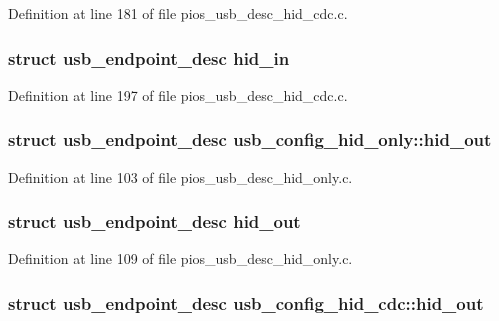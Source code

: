Definition at line 181 of file pios\-\_\-usb\-\_\-desc\-\_\-hid\-\_\-cdc.\-c.

\hypertarget{group___p_i_o_s___u_s_b___d_e_s_c_gad74809997499537622da0aaac4d1c3da}{
\subsubsection[{hid\-\_\-in}]{\setlength{\rightskip}{0pt plus 5cm}struct {\bf usb\-\_\-endpoint\-\_\-desc} hid\-\_\-in}}\label{group___p_i_o_s___u_s_b___d_e_s_c_gad74809997499537622da0aaac4d1c3da}


Definition at line 197 of file pios\-\_\-usb\-\_\-desc\-\_\-hid\-\_\-cdc.\-c.

\hypertarget{group___p_i_o_s___u_s_b___d_e_s_c_ga0bdaf8c80f7739bea621a6d5aa272641}{
\subsubsection[{hid\-\_\-out}]{\setlength{\rightskip}{0pt plus 5cm}struct {\bf usb\-\_\-endpoint\-\_\-desc} usb\-\_\-config\-\_\-hid\-\_\-only\-::hid\-\_\-out}}\label{group___p_i_o_s___u_s_b___d_e_s_c_ga0bdaf8c80f7739bea621a6d5aa272641}


Definition at line 103 of file pios\-\_\-usb\-\_\-desc\-\_\-hid\-\_\-only.\-c.

\hypertarget{group___p_i_o_s___u_s_b___d_e_s_c_ga0e5a30c27a737b9c3e117e4e8b755b8d}{
\subsubsection[{hid\-\_\-out}]{\setlength{\rightskip}{0pt plus 5cm}struct {\bf usb\-\_\-endpoint\-\_\-desc} hid\-\_\-out}}\label{group___p_i_o_s___u_s_b___d_e_s_c_ga0e5a30c27a737b9c3e117e4e8b755b8d}


Definition at line 109 of file pios\-\_\-usb\-\_\-desc\-\_\-hid\-\_\-only.\-c.

\hypertarget{group___p_i_o_s___u_s_b___d_e_s_c_gad76c86a5c7e42e823404bf0e7ddff4f2}{
\subsubsection[{hid\-\_\-out}]{\setlength{\rightskip}{0pt plus 5cm}struct {\bf usb\-\_\-endpoint\-\_\-desc} usb\-\_\-config\-\_\-hid\-\_\-cdc\-::hid\-\_\-out}}\label{group___p_i_o_s___u_s_b___d_e_s_c_gad76c86a5c7e42e823404bf0e7ddff4f2}


